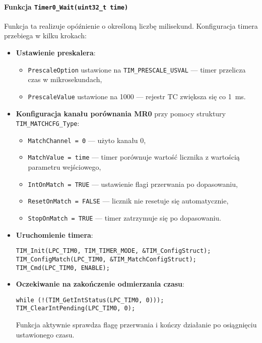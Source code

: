 \paragraph{Funkcja \texttt{Timer0\_Wait(uint32\_t time)}}

Funkcja ta realizuje opóźnienie o określoną liczbę milisekund. Konfiguracja timera przebiega w kilku krokach:

\begin{itemize}
    \item \textbf{Ustawienie preskalera}:
    \begin{itemize}
        \item \texttt{PrescaleOption} ustawione na \texttt{TIM\_PRESCALE\_USVAL} — timer przelicza czas w mikrosekundach,
        \item \texttt{PrescaleValue} ustawione na 1000 — rejestr TC zwiększa się co 1~ms.
    \end{itemize}
    
    \item \textbf{Konfiguracja kanału porównania MR0} przy pomocy struktury \texttt{TIM\_MATCHCFG\_Type}:
    \begin{itemize}
        \item \texttt{MatchChannel = 0} — użyto kanału 0,
        \item \texttt{MatchValue = time} — timer porównuje wartość licznika z wartością parametru wejściowego,
        \item \texttt{IntOnMatch = TRUE} — ustawienie flagi przerwania po dopasowaniu,
        \item \texttt{ResetOnMatch = FALSE} — licznik nie resetuje się automatycznie,
        \item \texttt{StopOnMatch = TRUE} — timer zatrzymuje się po dopasowaniu.
    \end{itemize}
    
    \item \textbf{Uruchomienie timera}:
    \begin{verbatim}
TIM_Init(LPC_TIM0, TIM_TIMER_MODE, &TIM_ConfigStruct);
TIM_ConfigMatch(LPC_TIM0, &TIM_MatchConfigStruct);
TIM_Cmd(LPC_TIM0, ENABLE);
    \end{verbatim}

    \item \textbf{Oczekiwanie na zakończenie odmierzania czasu}:
    \begin{verbatim}
while (!(TIM_GetIntStatus(LPC_TIM0, 0)));
TIM_ClearIntPending(LPC_TIM0, 0);
    \end{verbatim}
    Funkcja aktywnie sprawdza flagę przerwania i kończy działanie po osiągnięciu ustawionego czasu.
\end{itemize}

